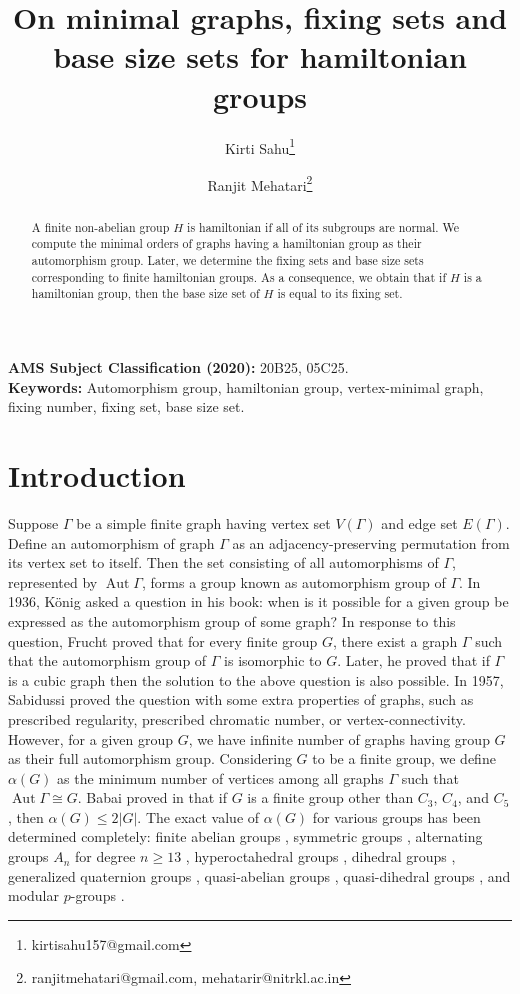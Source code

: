 \documentclass[12pt]{article}
\theoremstyle{plain}
\theoremstyle{definition}
\newcommand{\Aut}{\mathop{\mathrm{Aut}}}
\begin{document}
	\setcounter{Maxaffil}{3}
	\title{On minimal graphs, fixing sets and base size sets for hamiltonian groups}
	\author[ ]{Kirti Sahu\thanks{kirtisahu157@gmail.com}}
	\author[ ]{Ranjit Mehatari\thanks{ranjitmehatari@gmail.com, mehatarir@nitrkl.ac.in}}
	\maketitle
	\begin{abstract}
		A finite non-abelian group $H$ is hamiltonian if all of its subgroups are normal. We compute the minimal orders of graphs having a hamiltonian group as their automorphism group. Later, we determine the fixing sets and base size sets corresponding to finite hamiltonian groups. As a consequence, we obtain that if $H$ is a hamiltonian group, then the base size set of $H$ is equal to its fixing set.
	\end{abstract}
	
	\textbf{AMS Subject Classification (2020):} 20B25, 05C25.\\
	\textbf{Keywords:} Automorphism group, hamiltonian group, vertex-minimal graph, fixing number, fixing set, base size set.
	
	\section{Introduction}
	Suppose $\Gamma$ be a simple finite graph having vertex set $V(\Gamma)$ and edge set $E(\Gamma)$. Define an automorphism of graph $\Gamma$ as an adjacency-preserving permutation from its vertex set to itself. Then the set consisting of all automorphisms of $\Gamma$, represented by $\Aut \Gamma$, forms a group known as automorphism group of $\Gamma$. In 1936, K\"{o}nig asked a question in his book: when is it possible for a given group be expressed as the automorphism group of some graph? In response to this question, Frucht \cite{rf} proved that for every finite group $G$, there exist a graph $\Gamma$ such that the automorphism group of $\Gamma$ is isomorphic to $G$. Later, he proved that if $\Gamma$ is a cubic graph \cite{rf1} then the solution to the above question is also possible. In 1957, Sabidussi \cite{gs} proved the question with some extra properties of graphs, such as prescribed regularity, prescribed chromatic number, or vertex-connectivity. However, for a given group $G$, we have infinite number of graphs having group $G$ as their full automorphism group. Considering $G$ to be a finite group, we  define $\alpha(G)$ as the minimum number of vertices among all graphs $\Gamma$ such that $\Aut \Gamma \cong G$. Babai proved in \cite{lb} that if $G$ is a finite group other than $C_3$, $C_4$, and $C_5$, then $\alpha(G)\leq 2|G|$. The exact value of $\alpha(G)$ for various groups has been determined completely: finite abelian groups \cite{wca}, symmetric groups \cite{lv}, alternating groups $A_{n}$ for degree $n \geq 13$ \cite{mw}, hyperoctahedral groups \cite{adg}, dihedral groups \cite{lsc,lc,gh,dj}, generalized quaternion groups \cite{lscg}, quasi-abelian groups \cite{lz}, quasi-dihedral groups \cite{lz}, and modular $p$-groups \cite{sm}.\medskip
	
\end{document}
